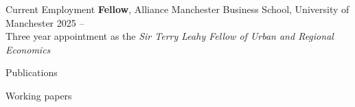 \documentclass{resume}
\begin{document}
\begin{rSection}{Current Employment}
{\bf Fellow}, Alliance Manchester Business School, University of Manchester \hfill {2025 -- }\\
Three year appointment as the \textit{Sir Terry Leahy Fellow of Urban and Regional Economics}
\end{rSection}

\begin{rSection}{Publications}
\begin{refsection}
\nocite{*}
\printbibliography[heading=none]
\end{refsection}
\end{rSection}


\begin{rSection}{Working papers}
\begin{refsection}
\nocite{*}
\printbibliography[heading=none]
\end{refsection}
\end{rSection}
\end{document}
